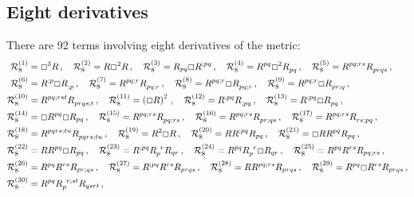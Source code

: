 \documentclass[11pt]{article}
\begin{document}
{\subsection{Eight derivatives}
There are 92 terms involving eight derivatives of the metric:
\begin{align}
\mathcal{R}_{8}^{(1)} &= \Box^3 R \, ,
\quad
\mathcal{R}_{8}^{(2)} = R \Box^2 R \, ,
\quad
\mathcal{R}_{8}^{(3)} = R_{pq} \Box\tensor{R}{^{;pq}} \,,
\quad
\mathcal{R}_{8}^{(4)} = R^{pq} \Box^2 \tensor{R}{_{pq}} \, ,
\quad
\mathcal{R}_{8}^{(5)} = \tensor{R}{^{pq;rs}} \tensor{R}{_{prqs}}
\, ,
\nonumber\\
\mathcal{R}_{8}^{(6)} &= \tensor{R}{^{;p}} \Box \tensor{R}{_{;p}} \, ,
\quad
\mathcal{R}_{8}^{(7)} = \tensor{R}{^{pq;r}} \tensor{R}{_{pq;r}} \, ,
\quad
\mathcal{R}_{8}^{(8)} = \tensor{R}{^{pq;r}} \Box \tensor{R}{_{pq;r}} \, ,
\quad
\mathcal{R}_{8}^{(9)} = \tensor{R}{^{pq;r}} \Box \tensor{R}{_{pr;q}} \, ,
\nonumber\\
\mathcal{R}_{8}^{(10)} &= \tensor{R}{^{pq;rst}} \tensor{R}{_{prqs;t}} \, ,
\quad
\mathcal{R}_{8}^{(11)} = \left( \Box R \right)^2 \, ,
\quad
\mathcal{R}_{8}^{(12)} = \tensor{R}{^{;pq}} \tensor{R}{_{;pq}} \, ,
\quad
\mathcal{R}_{8}^{(13)} = \tensor{R}{^{;pq}} \Box \tensor{R}{_{pq}} \, ,
\nonumber\\
\mathcal{R}_{8}^{(14)} &= \Box R^{pq} \Box R_{pq} \, , 
\quad
\mathcal{R}_{8}^{(15)} = \tensor{R}{^{pq;rs}} \tensor{R}{_{pq;rs}} \, ,
\quad
\mathcal{R}_{8}^{(16)} = \tensor{R}{^{pq;rs}} \tensor{R}{_{pr;qs}} \, ,
\quad
\mathcal{R}_{8}^{(17)} = \tensor{R}{^{pq;rs}} \tensor{R}{_{rs;pq}} \, ,
\nonumber\\
\mathcal{R}_{8}^{(18)} &= \tensor{R}{^{pqrs;tu}} \tensor{R}{_{pqrs;tu}} \, ,
\quad
\mathcal{R}_{8}^{(19)} = R^2 \Box R \, , 
\quad 
\mathcal{R}_{8}^{(20)} = R \tensor{R}{^{;pq}} R_{pq} \, ,
\quad 
\mathcal{R}_{8}^{(21)} = \Box R R^{pq} R_{pq} \, ,
\nonumber\\
\mathcal{R}_{8}^{(22)} &= R R^{pq} \Box R_{pq} \, ,
\quad
\mathcal{R}_{8}^{(23)} = R^{;pq} \tensor{R}{_p^r} R_{qr} \, ,
\quad
\mathcal{R}_{8}^{(24)} = R^{pq}  \tensor{R}{_p^r} \Box R_{qr} \, ,
\quad 
\mathcal{R}_{8}^{(25)} = R^{pq} R^{rs} R_{pq;rs} \, ,
\nonumber\\
\mathcal{R}_{8}^{(26)} &= R^{pq} R^{rs} R_{pr;qs} \, ,
\quad
\mathcal{R}_{8}^{(27)} = R^{;pq} R^{rs} R_{prqs} \, ,
\quad 
\mathcal{R}_{8}^{(28)} = R R^{pq;rs} R_{prqs} \, ,
\quad 
\mathcal{R}_{8}^{(29)} = R^{pq} \Box R^{rs} R_{prqs} \, ,
\nonumber\\
\mathcal{R}_{8}^{(30)} &= R^{pq} \tensor{R}{_p^{r;st}} R_{qsrt} \, ,

\end{align}}
\end{document}

